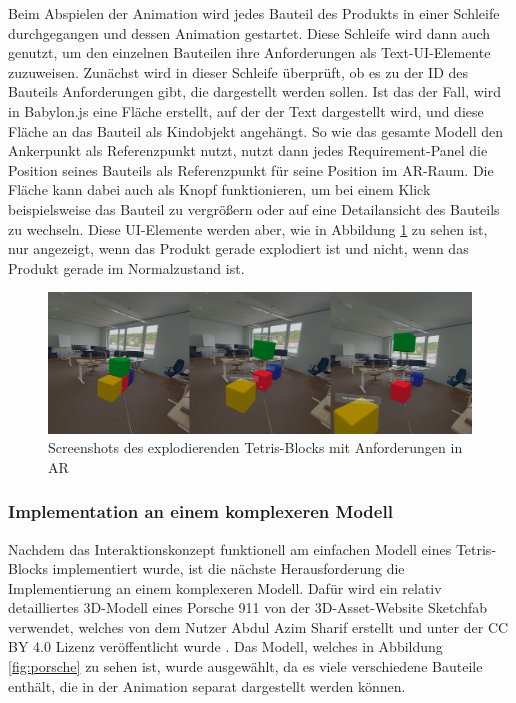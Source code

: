 Beim Abspielen der Animation wird jedes Bauteil des Produkts in einer Schleife durchgegangen und dessen Animation gestartet.
Diese Schleife wird dann auch genutzt, um den einzelnen Bauteilen ihre Anforderungen als Text-UI-Elemente zuzuweisen.
Zunächst wird in dieser Schleife überprüft, ob es zu der ID des Bauteils Anforderungen gibt, die dargestellt werden sollen.
Ist das der Fall, wird in Babylon.js eine Fläche erstellt, auf der der Text dargestellt wird, und diese Fläche an das Bauteil als Kindobjekt angehängt.
So wie das gesamte Modell den Ankerpunkt als Referenzpunkt nutzt, nutzt dann jedes Requirement-Panel die Position seines Bauteils als Referenzpunkt für seine Position im AR-Raum.
Die Fläche kann dabei auch als Knopf funktionieren, um bei einem Klick beispielsweise das Bauteil zu vergrößern oder auf eine Detailansicht des Bauteils zu wechseln.
Diese UI-Elemente werden aber, wie in Abbildung \ref{fig:tetris-explosion} zu sehen ist, nur angezeigt, wenn das Produkt gerade \glqq{}explodiert\grqq{} ist und nicht, wenn das Produkt gerade im Normalzustand ist.

\begin{figure}[H]
    \centering
    \includegraphics[width=1\textwidth]{images/tetris-explosion.png}
    \caption{Screenshots des explodierenden Tetris-Blocks mit Anforderungen in AR}
    \label{fig:tetris-explosion}
\end{figure}

\subsubsection{Implementation an einem komplexeren Modell}

Nachdem das Interaktionskonzept funktionell am einfachen Modell eines Tetris-Blocks implementiert wurde, ist die nächste Herausforderung die Implementierung an einem komplexeren Modell.
Dafür wird ein relativ detailliertes 3D-Modell eines Porsche 911 von der 3D-Asset-Website Sketchfab verwendet, welches von dem Nutzer Abdul Azim Sharif erstellt und unter der CC BY 4.0 Lizenz veröffentlicht wurde \autocite[][]{SketchfabPorsche}.
Das Modell, welches in Abbildung \ref{fig:porsche} zu sehen ist, wurde ausgewählt, da es viele verschiedene Bauteile enthält, die in der Animation separat dargestellt werden können.

